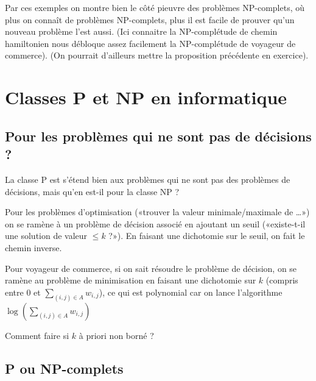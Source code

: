 \begin{com}
	Par ces exemples on montre bien le côté pieuvre des problèmes NP-complets, où plus on connaît de problèmes NP-complets, plus il est facile de prouver qu'un nouveau problème l'est aussi. (Ici connaitre la NP-complétude de chemin hamiltonien nous débloque assez facilement la NP-complétude de voyageur de commerce). (On pourrait d'ailleurs mettre la proposition précédente en exercice).
\end{com}

\section{Classes P et NP en informatique}

\subsection{Pour les problèmes qui ne sont pas de décisions ?}

\begin{rem}
	La classe P est s'étend bien aux problèmes qui ne sont pas des problèmes de décisions, mais qu'en est-il pour la classe NP ?
\end{rem}

\begin{personalise}[Méthode]
	Pour les problèmes d'optimisation («trouver la valeur minimale/maximale de \dots») on se ramène à un problème de décision associé en ajoutant un seuil («existe-t-il une solution de valeur $\leq k$ ?»). En faisant une dichotomie sur le seuil, on fait le chemin inverse.
\end{personalise}

\begin{example}
	Pour voyageur de commerce, si on sait résoudre le problème de décision, on se ramène au problème de minimisation en faisant une dichotomie sur $k$ (compris entre $0$ et $\sum\limits_{(i,j) \in A} w_{i,j}$), ce qui est polynomial car on lance l'algorithme $\log \left( \sum\limits_{(i,j) \in A} w_{i,j} \right)$
\end{example}

\begin{exercise}
	Comment faire si $k$ à priori non borné ?
\end{exercise}

\subsection{P ou NP-complets}


